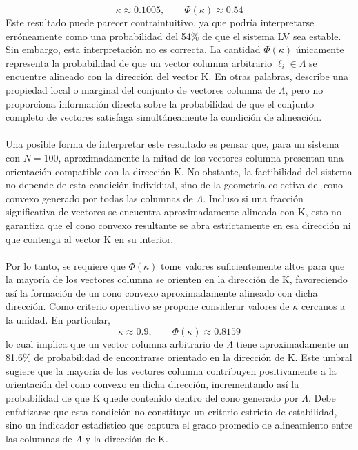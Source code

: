 $$\kappa\approx  0.1005,\qquad \Phi(\kappa)\approx 0.54$$
Este resultado puede parecer contraintuitivo, ya que podría interpretarse erróneamente como una probabilidad del 54\% de que el sistema LV sea estable. Sin embargo, esta interpretación no es correcta. La cantidad $\Phi(\kappa)$ únicamente representa la probabilidad de que un vector columna arbitrario $\ell_i\in\Lambda$ se encuentre alineado con la dirección del vector $\mathrm{K}$. En otras palabras, describe una propiedad local o marginal del conjunto de vectores columna de $\Lambda$, pero no proporciona información directa sobre la probabilidad de que el conjunto completo de vectores satisfaga simultáneamente la condición de alineación. \\
\\
Una posible forma de interpretar este resultado es pensar que, para un sistema con 
$N=100$, aproximadamente la mitad de los vectores columna presentan una orientación compatible con la dirección $\mathrm{K}$. No obstante, la factibilidad del sistema no depende de esta condición individual, sino de la geometría colectiva del cono convexo generado por todas las columnas de $\Lambda$. Incluso si una fracción significativa de vectores se encuentra aproximadamente alineada con $\mathrm{K}$, esto no garantiza que el cono convexo resultante se abra estrictamente en esa dirección ni que contenga al vector $\mathrm{K}$ en su interior.\\
\\
Por lo tanto, se requiere que $\Phi(\kappa)$ tome valores suficientemente altos para que la mayoría de los vectores columna se orienten en la dirección de $\mathrm{K}$, favoreciendo así la formación de un cono convexo aproximadamente alineado con dicha dirección. Como criterio operativo se propone considerar valores de $\kappa$ cercanos a la unidad. En particular,
\begin{equation}\label{eqn:kappaEff}
	\kappa\approx 0.9,\qquad\Phi(\kappa)\approx 0.8159
\end{equation}
lo cual implica que un vector columna arbitrario de $\Lambda$ tiene aproximadamente un 
81.6\% de probabilidad de encontrarse orientado en la dirección de $\mathrm{K}$. Este umbral sugiere que la mayoría de los vectores columna contribuyen positivamente a la orientación del cono convexo en dicha dirección, incrementando así la probabilidad de que $\mathrm{K}$ quede contenido dentro del cono generado por $\Lambda$. Debe enfatizarse que esta condición no constituye un criterio estricto de estabilidad, sino un indicador estadístico que captura el grado promedio de alineamiento entre las columnas de $\Lambda$ y la dirección de $\mathrm{K}$.\\
